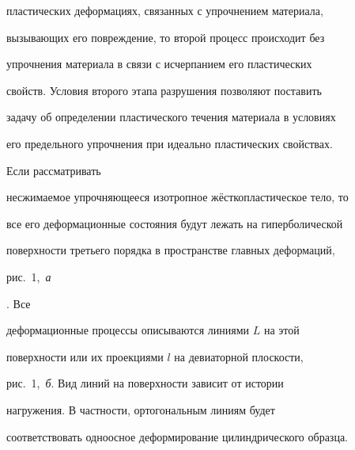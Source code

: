 пластических деформациях, связанных с упрочнением материала,

вызывающих его повреждение, то второй процесс происходит без

упрочнения материала в связи с исчерпанием его пластических

свойств. Условия второго этапа разрушения позволяют поставить

задачу об определении пластического течения материала в условиях

его предельного упрочнения при идеально пластических свойствах.



\smallskip



 Если рассматривать

несжимаемое упрочняющееся изотропное жёсткопластическое тело, то

все его деформационные состояния будут лежать на гиперболической

поверхности третьего порядка в пространстве главных деформаций,

рис.~1,~{\sl а}

\cite{bukh:bib:KhromKotchGrig,bukh:bib:BukhGrigKotchKhrom}. Все

деформационные процессы описываются линиями $L$ на этой

поверхности или их проекциями $l$ на девиаторной плоскости,

рис.~1,~{\sl б}. Вид линий на поверхности зависит от истории

нагружения. В частности, ортогональным линиям будет

соответствовать одноосное деформирование цилиндрического образца.



